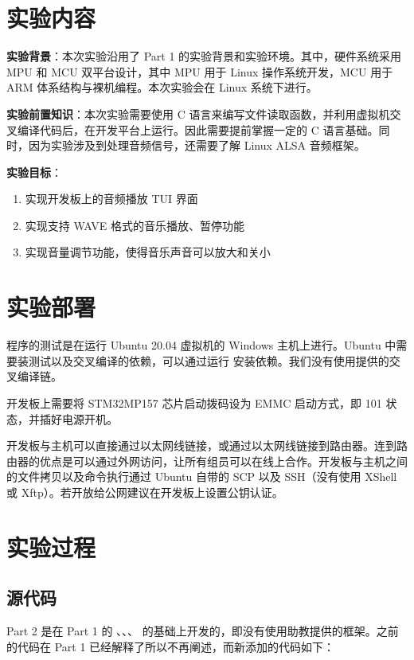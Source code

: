
\section{实验内容}

\textbf{实验背景}：本次实验沿用了 Part 1 的实验背景和实验环境。其中，硬件系统采用 MPU 和 MCU 双平台设计，其中 MPU 用于 Linux 操作系统开发，MCU 用于 ARM 体系结构与裸机编程。本次实验会在 Linux 系统下进行。

\textbf{实验前置知识}：本次实验需要使用 C 语言来编写文件读取函数，并利用虚拟机交叉编译代码后，在开发平台上运行。因此需要提前掌握一定的 C 语言基础。同时，因为实验涉及到处理音频信号，还需要了解 Linux ALSA 音频框架。

\textbf{实验目标}：

\begin{enumerate}
    \item 实现开发板上的音频播放 TUI 界面
    \item 实现支持 WAVE 格式的音乐播放、暂停功能
    \item 实现音量调节功能，使得音乐声音可以放大和关小
\end{enumerate}

\section{实验部署}

程序的测试是在运行 Ubuntu 20.04 虚拟机的 Windows 主机上进行。Ubuntu 中需要装测试以及交叉编译的依赖，可以通过运行  安装依赖。我们没有使用提供的交叉编译链。

开发板上需要将 STM32MP157 芯片启动拨码设为 EMMC 启动方式，即 101 状态，并插好电源开机。

开发板与主机可以直接通过以太网线链接，或通过以太网线链接到路由器。连到路由器的优点是可以通过外网访问，让所有组员可以在线上合作。开发板与主机之间的文件拷贝以及命令执行通过 Ubuntu 自带的 SCP 以及 SSH（没有使用 XShell 或 Xftp）。若开放给公网建议在开发板上设置公钥认证。

\section{实验过程}

\subsection{源代码}


Part 2 是在 Part 1 的 、、、 的基础上开发的，即没有使用助教提供的框架。之前的代码在 Part 1 已经解释了所以不再阐述，而新添加的代码如下：

